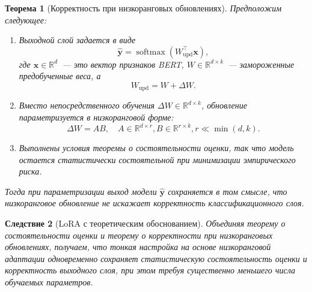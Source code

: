 \documentclass{dissert}
\newtheorem{theorem}{Теорема}
\newtheorem{corollary}[theorem]{Следствие}
\begin{document}
\begin{theorem}[Корректность при низкоранговых обновлениях]
Предположим следующее:
\begin{enumerate}
    \item Выходной слой задается в виде
    \begin{equation}
        \hat{\mathbf{y}} = \operatorname{softmax}\!\left(W_{\mathrm{upd}}^{\top} \mathbf{x}\right),
    \end{equation}
    где $\mathbf{x} \in \mathbb{R}^d$~--- это вектор признаков BERT, $W \in \mathbb{R}^{d \times k}$~--- замороженные предобученные веса, а
    \begin{equation}
        W_{\mathrm{upd}} = W + \Delta W.
    \end{equation}

    \item Вместо непосредственного обучения $\Delta W \in \mathbb{R}^{d \times k}$, обновление параметризуется в низкоранговой форме:
    \begin{equation}
        \Delta W = A B,
        \quad A \in \mathbb{R}^{d \times r},
        B \in \mathbb{R}^{r \times k},
        r \ll \min(d,k).
    \end{equation}

    \item Выполнены условия теоремы о состоятельности оценки, так что модель остается статистически состоятельной при минимизации эмпирического риска.
\end{enumerate}

Тогда при параметризации выход модели $\hat{\mathbf{y}}$ сохраняется в том смысле, что низкоранговое обновление не искажает корректность классификационного слоя.
\end{theorem}

\begin{corollary}[LoRA с теоретическим обоснованием]
Объединяя теорему о состоятельности оценки и теорему о корректности при низкоранговых обновлениях, получаем, что тонкая настройка на основе низкоранговой адаптации одновременно сохраняет статистическую состоятельность оценки и корректность выходного слоя, при этом требуя существенно меньшего числа обучаемых параметров.
\end{corollary}
\end{document}
